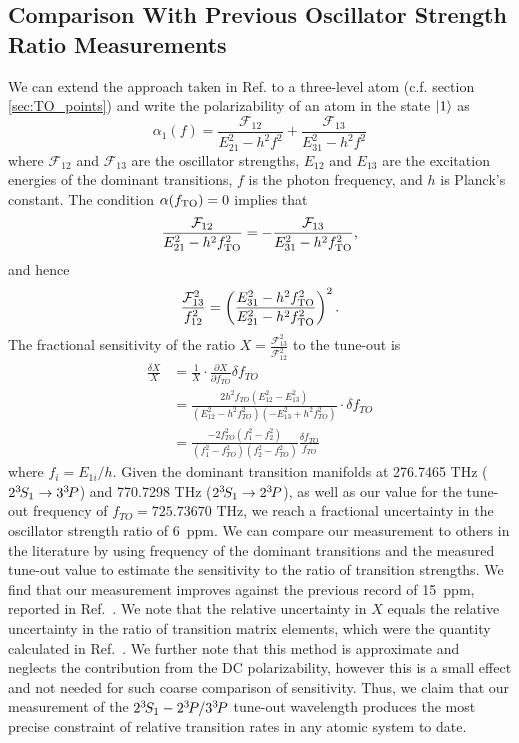 \subsection{Comparison With Previous Oscillator Strength Ratio Measurements}
	
	We can extend the approach taken in Ref. \cite{Mitroy13} to a three-level atom (c.f. section \ref{sec:TO_points}) and write the polarizability of an atom in the state $|1\rangle$ as 
	\begin{equation}
	\alpha_1(f) = \frac{\mathcal{F}_{12}}{E_{21}^2-h^2 f^2}+\frac{\mathcal{F}_{13}}{E_{31}^2-h^2 f^2}
	\end{equation}
	where $\mathcal{F}_{12}$ and $\mathcal{F}_{13}$ are the oscillator strengths, $E_{12}$ and $E_{13}$ are the excitation energies of the dominant transitions, $f$ is the photon frequency, and \(h\) is Planck's constant. The condition $\alpha(f_\mathrm{TO})=0$ implies that
	\begin{equation}
		 \frac{\mathcal{F}_{12}}{E_{21}^2-h^2 f_\mathrm{TO}^2} = -\frac{\mathcal{F}_{13}}{E_{31}^2-h^2 f_\mathrm{TO}^2},
	\end{equation}
	and hence
	\begin{equation}
		\frac{\mathcal{F}_{13}^2}{f_{12}^2} = \left(\frac{E_{31}^2-h^2 f_\mathrm{TO}^2}{E_{21}^2-h^2 f_\mathrm{TO}^2}\right)^2.
	\end{equation}
	The fractional sensitivity of the ratio $X=\frac{\mathcal{F}_{13}^2}{\mathcal{F}_{12}^2}$ to the tune-out is
	\begin{align}
	    \frac{\delta X}{X} &= \frac{1}{X} \cdot  \frac{\partial X} {\partial f_{TO}} \delta f_{TO} \\
				    &=\frac{2  h^2 f_{TO} (E_{12}^2-E_{13}^2)}{(E_{12}^2-h^2 f_{TO}^2) (-E_{13}^2 + h^2 f_{TO}^2 )} \cdot \delta  f_{TO}\\
				    & = \frac{-2 f_{TO}^2 (f_1^2-f_2^2)}{(f_1^2-f_{TO}^2)(f_2^2-f_{TO}^2)} \frac{\delta  f_{TO}}{f_{TO}}
	\end{align}
	where $f_i=E_{1i}/h$.
	Given the dominant transition manifolds at 276.7465 THz (\(2^{3\!}S_1 \to 3^{3\!}P \)) and 770.7298 THz (\(2^{3\!}S_1 \to 2^{3\!}P\)), as well as our value for the tune-out frequency of \(f_{TO}=725.73670\) THz, we reach a fractional uncertainty in the oscillator strength ratio of 6~ppm.
	We can compare our measurement to others in the literature by using frequency of the dominant transitions and the measured tune-out value to estimate the sensitivity to the ratio of transition strengths. 
	We find that our measurement improves against the previous record of 15~ppm, reported in Ref.~\cite{Leonard15}. 
	We note that the relative uncertainty in $X$ equals the relative uncertainty in the ratio of transition matrix elements, which were the quantity calculated in Ref.~\cite{Leonard15}.
	We further note that this method is approximate and neglects the contribution from the DC polarizability, however this is a small effect and not needed for such coarse comparison of sensitivity. 
	Thus, we claim that our measurement of the $2^{3\!}S_1- 2^{3\!}P / 3^{3\!}P$ tune-out wavelength produces the most precise constraint of relative transition rates in any atomic system to date. 


